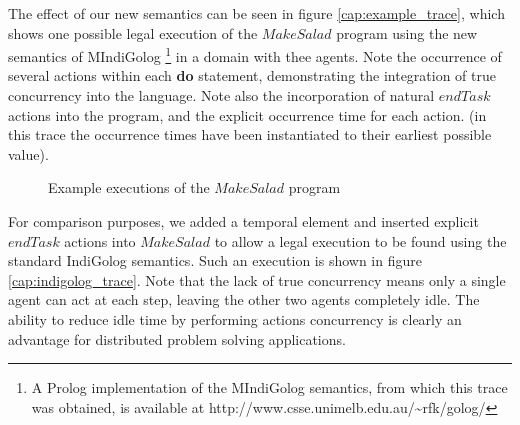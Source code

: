 The effect of our new semantics can be seen in figure \ref{cap:example_trace},
which shows one possible legal execution of the $MakeSalad$ program
using the new semantics of MIndiGolog%
\footnote{A Prolog implementation of the MIndiGolog semantics, from which this
trace was obtained, is available at http://www.csse.unimelb.edu.au/\textasciitilde{}rfk/golog/%
} in a domain with thee agents. Note the occurrence of several actions
within each \textbf{do} statement, demonstrating the integration of
true concurrency into the language. Note also the incorporation of
natural $endTask$ actions into the program, and the explicit occurrence
time for each action. (in this trace the occurrence times have been
instantiated to their earliest possible value).

%
\begin{figure*}[t]
\centering {} 

\caption{Example executions of the $MakeSalad$ program}

\end{figure*}


For comparison purposes, we added a temporal element and inserted
explicit $endTask$ actions into $MakeSalad$ to allow a legal execution
to be found using the standard IndiGolog semantics. Such an execution
is shown in figure \ref{cap:indigolog_trace}. Note that the lack
of true concurrency means only a single agent can act at each step,
leaving the other two agents completely idle. The ability to reduce
idle time by performing actions concurrency is clearly an advantage
for distributed problem solving applications.


